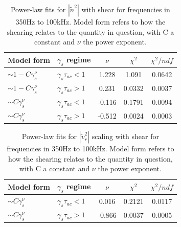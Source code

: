 \documentclass[aip,pop,amsmath,amssymb,reprint,superscriptaddress]{revtex4-1} %
\begin{document}
\begin{table}
\caption{\label{tab:table1}Power-law fits for $|\tilde{n}^{2}|$  with shear for frequencies in 350Hz to 100kHz. Model form refers to how the shearing relates to the quantity in question, with C a constant and $\nu$ the power exponent.}
\begin{ruledtabular}
\begin{tabular}{llccc}
Model form&$\gamma_{s}$ regime&$\nu$&$\chi^2$&$\chi^2/ndf$\\
\hline
$\sim 1-C\gamma_{s}^\nu$&$\gamma_{s}\tau_{ac}<1$&1.228&1.091&0.0642\\
$\sim 1-C\gamma_{s}^\nu$&$\gamma_{s}\tau_{ac}>1$&0.231&0.0332&0.0037\\
$\sim C\gamma_{s}^\nu$&$\gamma_{s}\tau_{ac}<1$&-0.116&0.1791&0.0094\\
$\sim C\gamma_{s}^\nu$&$\gamma_{s}\tau_{ac}>1$&-0.512&0.0024&0.0003\\
\end{tabular}
\end{ruledtabular}
\end{table}

\begin{table}
\caption{\label{tab:table2}Power-law fits for $|\tilde{v}_{r}^{2}|$ scaling with shear for frequencies in 350Hz to 100kHz. Model form refers to how the shearing relates to the quantity in question, with C a constant and $\nu$ the power exponent.}
\begin{ruledtabular}
\begin{tabular}{llccc}
Model form&$\gamma_{s}$ regime&$\nu$&$\chi^2$&$\chi^2/ndf$\\
\hline
$\sim C\gamma_{s}^\nu$&$\gamma_{s}\tau_{ac}<1$&0.016&0.2121&0.0117\\
$\sim C\gamma_{s}^\nu$&$\gamma_{s}\tau_{ac}>1$&-0.866&0.0037&0.0005\\
\end{tabular}
\end{ruledtabular}
\end{table}
\end{document}
